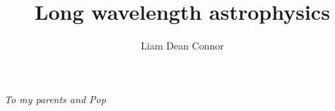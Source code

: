 \documentclass[11pt]{ut-thesis}
\author{Liam Dean Connor}
\title{Long wavelength astrophysics}
\begin{document}
\begin{preliminary}

\maketitle



\begin{abstract} %

\end{abstract}



\vspace*{\fill}
\begin{center}
{\em To my parents and Pop}
\end{center}
\vfill

\newpage %



\end{preliminary}
\end{document}
